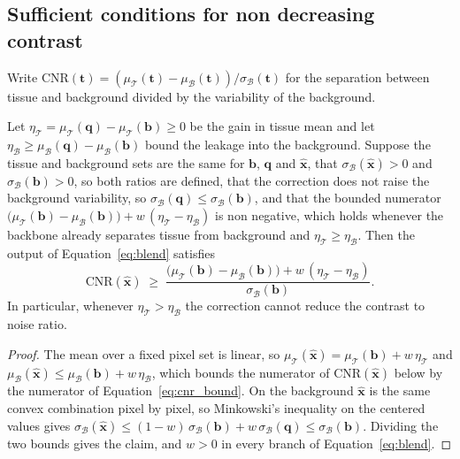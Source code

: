 \subsection{Sufficient conditions for non decreasing contrast}
\label{sec:cnr_guarantee}
Write
$\mathrm{CNR}(\mathbf{t}) = (\mu_\mathcal{T}(\mathbf{t}) - \mu_\mathcal{B}(\mathbf{t})) / \sigma_\mathcal{B}(\mathbf{t})$
for the separation between tissue and background divided by the variability of the background.

\begin{theorem}
\label{thm:cnr}
Let $\eta_\mathcal{T} = \mu_\mathcal{T}(\mathbf{q}) - \mu_\mathcal{T}(\mathbf{b}) \ge 0$ be the gain in
tissue mean and let $\eta_\mathcal{B} \ge \mu_\mathcal{B}(\mathbf{q}) - \mu_\mathcal{B}(\mathbf{b})$
bound the leakage into the background. Suppose the tissue and background sets are the same for
$\mathbf{b}$, $\mathbf{q}$ and $\hat{\mathbf{x}}$, that
$\sigma_\mathcal{B}(\hat{\mathbf{x}}) > 0$ and $\sigma_\mathcal{B}(\mathbf{b}) > 0$, so both
ratios are defined, that the correction does not raise the background variability, so
$\sigma_\mathcal{B}(\mathbf{q}) \le \sigma_\mathcal{B}(\mathbf{b})$, and that the bounded numerator
$\big(\mu_\mathcal{T}(\mathbf{b}) - \mu_\mathcal{B}(\mathbf{b})\big) + w\,(\eta_\mathcal{T} -
\eta_\mathcal{B})$ is non negative, which holds whenever the backbone already separates tissue from
background and $\eta_\mathcal{T} \ge \eta_\mathcal{B}$. Then the output of
Equation~\eqref{eq:blend} satisfies
\begin{equation}
\mathrm{CNR}(\hat{\mathbf{x}}) \;\ge\;
\frac{\big(\mu_\mathcal{T}(\mathbf{b}) - \mu_\mathcal{B}(\mathbf{b})\big) + w\,(\eta_\mathcal{T} - \eta_\mathcal{B})}
     {\sigma_\mathcal{B}(\mathbf{b})} .
\label{eq:cnr_bound}
\end{equation}
In particular, whenever $\eta_\mathcal{T} > \eta_\mathcal{B}$ the correction cannot reduce the
contrast to noise ratio.
\end{theorem}

\begin{proof}
The mean over a fixed pixel set is linear, so
$\mu_\mathcal{T}(\hat{\mathbf{x}}) = \mu_\mathcal{T}(\mathbf{b}) + w\,\eta_\mathcal{T}$ and
$\mu_\mathcal{B}(\hat{\mathbf{x}}) \le \mu_\mathcal{B}(\mathbf{b}) + w\,\eta_\mathcal{B}$, which bounds
the numerator of $\mathrm{CNR}(\hat{\mathbf{x}})$ below by the numerator of
Equation~\eqref{eq:cnr_bound}. On the background $\hat{\mathbf{x}}$ is the same convex combination
pixel by pixel, so Minkowski's inequality on the centered values gives
$\sigma_\mathcal{B}(\hat{\mathbf{x}}) \le (1-w)\,\sigma_\mathcal{B}(\mathbf{b}) + w\,\sigma_\mathcal{B}(\mathbf{q}) \le \sigma_\mathcal{B}(\mathbf{b})$.
Dividing the two bounds gives the claim, and $w > 0$ in every branch of Equation~\eqref{eq:blend}.
\end{proof}


